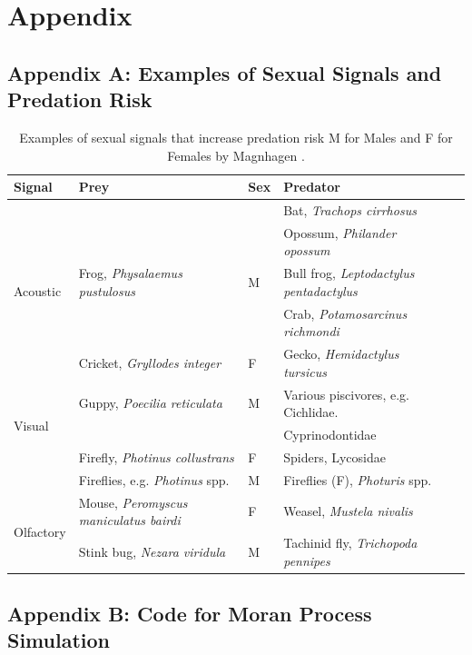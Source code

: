 \clearpage 

\section{Appendix}



\subsection*{Appendix A: Examples of Sexual Signals and Predation Risk}

\begin{table}[h]
\centering
\begin{tabular}{lllll}
\textbf{Signal} & \textbf{Prey} & \textbf{Sex} & \textbf{Predator} \\ \hline \hline
\multirow{5}{*}{Acoustic} 
  & &  & Bat, \textit{Trachops cirrhosus} \\
  & &  & Opossum, \textit{Philander opossum}  \\
  & Frog, \textit{Physalaemus pustulosus}  & M & Bull frog, \textit{Leptodactylus pentadactylus} \\
  &  & & Crab, \textit{Potamosarcinus richmondi}  \\
  & Cricket, \textit{Gryllodes integer} & F & Gecko, \textit{Hemidactylus tursicus} \\ \hline
\multirow{3}{*}{Visual} 
  & Guppy, \textit{Poecilia reticulata} & M & Various piscivores, e.g. Cichlidae.\\
  &&&Cyprinodontidae \\
  & Firefly, \textit{Photinus collustrans} & F & Spiders, Lycosidae  \\
  & Fireflies, e.g. \textit{Photinus} spp. & M & Fireflies (F), \textit{Photuris} spp. \\ \hline
\multirow{2}{*}{Olfactory} 
  & Mouse, \textit{Peromyscus maniculatus bairdi} & F & Weasel, \textit{Mustela nivalis} \\
  & Stink bug, \textit{Nezara viridula} & M & Tachinid fly, \textit{Trichopoda pennipes} \\ \hline
\end{tabular}
\caption{Examples of sexual signals that increase predation risk M for Males and F for Females by Magnhagen \cite{magnhagen1991}.}
\label{tab:1}
\end{table}

\subsection*{Appendix B: Code for Moran Process Simulation}
\label{app:code_moran}

